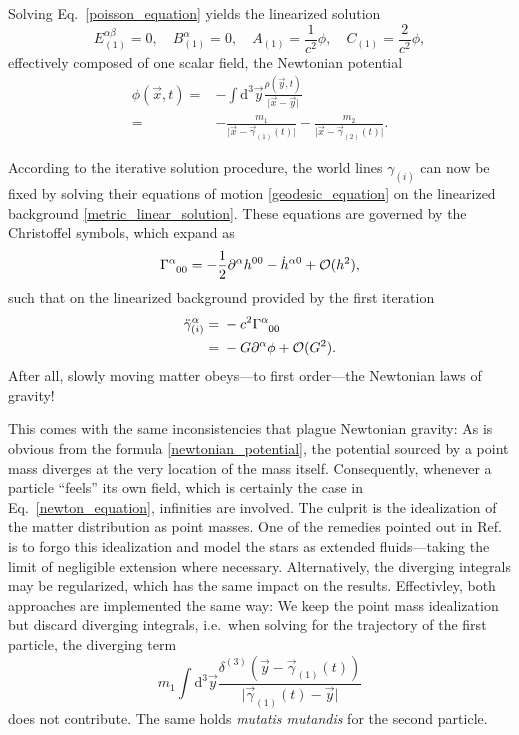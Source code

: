Solving Eq.~\eqref{poisson_equation} yields the linearized solution
\begin{equation}\label{metric_linear_solution}
  E^{\alpha\beta}_{(1)} = 0,\quad B^\alpha_{(1)} = 0,\quad A_{(1)} = \frac{1}{c^2}\phi,\quad C_{(1)} = \frac{2}{c^2} \phi,
\end{equation}
effectively composed of one scalar field, the Newtonian potential
\begin{equation}\label{newtonian_potential}
  \begin{aligned}
    \phi(\vec x,t) = {} & - \int \mathrm d^3\vec y\frac{\rho(\vec y,t)}{\lvert\vec x-\vec y\rvert} \\
    = {} & - \frac{m_1}{\lvert\vec x-\vec\gamma_{(1)}(t)\rvert} - \frac{m_2}{\lvert\vec x-\vec\gamma_{(2)}(t)\rvert}.
  \end{aligned}
\end{equation}

According to the iterative solution procedure, the world lines $\gamma_{(i)}$ can now be fixed by solving their equations of motion \eqref{geodesic_equation} on the linearized background \eqref{metric_linear_solution}. These equations are governed by the Christoffel symbols, which expand as
\begin{equation}
  \Gamma^\alpha_{\hphantom\alpha 00} = -\frac{1}{2}\partial^\alpha h^{00} - \dot h^{\alpha 0} + \mathcal O(h^2),
\end{equation}
such that on the linearized background provided by the first iteration
\begin{equation}\label{newton_equation}
  \begin{aligned}
    \ddot \gamma^\alpha_{(i)} = {} & - c^2 \Gamma^\alpha_{\hphantom\alpha 00} \\
    = {} & -G \partial^\alpha \phi + \mathcal O(G^2).
  \end{aligned}
\end{equation}
After all, slowly moving matter obeys---to first order---the Newtonian laws of gravity!

This comes with the same inconsistencies that plague Newtonian gravity: As is obvious from the formula \eqref{newtonian_potential}, the potential sourced by a point mass diverges at the very location of the mass itself. Consequently, whenever a particle ``feels'' its own field, which is certainly the case in Eq.~\eqref{newton_equation}, infinities are involved. The culprit is the idealization of the matter distribution as point masses. One of the remedies pointed out in Ref.\ \cite{poisson2014gravity} is to forgo this idealization and model the stars as extended fluids---taking the limit of negligible extension where necessary. Alternatively, the diverging integrals may be regularized, which has the same impact on the results. Effectivley, both approaches are implemented the same way: We keep the point mass idealization but discard diverging integrals, i.e.~when solving for the trajectory of the first particle, the diverging term
\begin{equation}
  m_1 \int\mathrm d^3\vec y \frac{\delta^{(3)}(\vec y - \vec\gamma_{(1)}(t))}{\lvert\vec\gamma_{(1)}(t) - \vec y\rvert}
\end{equation}
does not contribute. The same holds \emph{mutatis mutandis} for the second particle.

